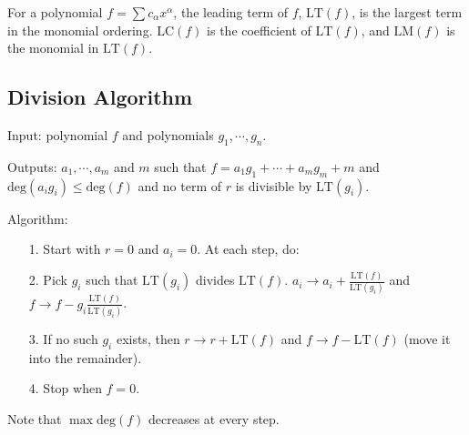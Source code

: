 \documentclass[a4paper,twoside,master.tex]{subfiles}
\begin{document}
For a polynomial $ f = \sum c_{\alpha} x^{\alpha} $, the leading term of $ f $, $ \text{LT}(f) $, is the largest term in the monomial ordering. $ \text{LC}(f) $ is the coefficient of $ \text{LT}(f) $, and $ \text{LM}(f) $ is the monomial in $ \text{LT}(f) $.

\subsection{Division Algorithm}
\label{sub:division_algorithm}

Input: polynomial $ f $ and polynomials $ g_1, \cdots, g_n $.

Outputs: $ a_1, \cdots, a_m $ and $ m $ such that $ f = a_1 g_1 + \cdots + a_m g_m + m $ and $ \text{deg}(a_i g_i) \leq \text{deg}(f) $ and no term of $ r $ is divisible by $ \text{LT}(g_i) $.

Algorithm:
\begin{itemize}
    \item[1.] Start with $ r = 0 $ and $ a_i = 0 $. At each step, do:
    \item[2.] Pick $ g_i $ such that $ \text{LT}(g_i) $ divides $ \text{LT}(f) $. $ a_i \to a_i + \frac{\text{LT}(f)}{\text{LT}(g_i)} $ and $ f \to f - g_i \frac{\text{LT}(f)}{\text{LT}(g_i)} $.
    \item[3.] If no such $ g_i $ exists, then $ r \to r + \text{LT}(f) $ and $ f \to f - \text{LT}(f) $ (move it into the remainder).
    \item[4.] Stop when $ f = 0 $.
\end{itemize}
Note that $ \max \text{deg}(f) $ decreases at every step.
\end{document}
